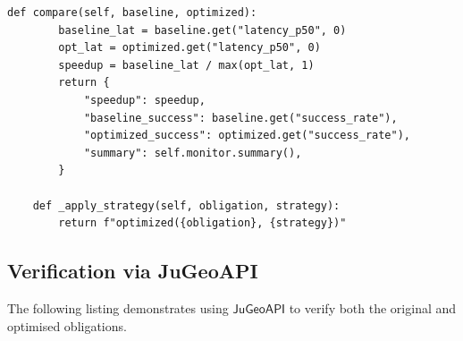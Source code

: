 \documentclass[11pt]{article}
\newcommand{\JuGeoAPI}{\mathsf{JuGeoAPI}}
\begin{document}
\begin{lstlisting}[style=jugeo-python,
  caption={Performance monitoring during optimisation},
  label={lst:perfmon}]
    def compare(self, baseline, optimized):
        baseline_lat = baseline.get("latency_p50", 0)
        opt_lat = optimized.get("latency_p50", 0)
        speedup = baseline_lat / max(opt_lat, 1)
        return {
            "speedup": speedup,
            "baseline_success": baseline.get("success_rate"),
            "optimized_success": optimized.get("success_rate"),
            "summary": self.monitor.summary(),
        }

    def _apply_strategy(self, obligation, strategy):
        return f"optimized({obligation}, {strategy})"
\end{lstlisting}

\subsection{Verification via JuGeoAPI}

The following listing demonstrates using $\JuGeoAPI$
to verify both the original and optimised obligations.
\end{document}
